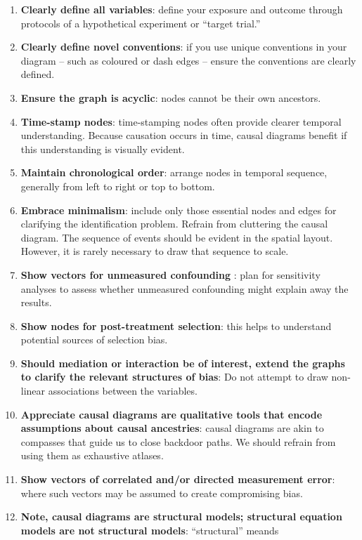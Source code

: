 \documentclass[
  singlecolumn]{article}
\begin{document}
\begin{enumerate}
\def\labelenumi{\arabic{enumi}.}
\item
  \textbf{Clearly define all variables}: define your exposure and
  outcome through protocols of a hypothetical experiment or ``target
  trial.''
\item
  \textbf{Clearly define novel conventions}: if you use unique
  conventions in your diagram -- such as coloured or dash edges --
  ensure the conventions are clearly defined.
\item
  \textbf{Ensure the graph is acyclic}: nodes cannot be their own
  ancestors.
\item
  \textbf{Time-stamp nodes}: time-stamping nodes often provide clearer
  temporal understanding. Because causation occurs in time, causal
  diagrams benefit if this understanding is visually evident.
\item
  \textbf{Maintain chronological order}: arrange nodes in temporal
  sequence, generally from left to right or top to bottom.
\item
  \textbf{Embrace minimalism}: include only those essential nodes and
  edges for clarifying the identification problem. Refrain from
  cluttering the causal diagram. The sequence of events should be
  evident in the spatial layout. However, it is rarely necessary to draw
  that sequence to scale.
\item
  \textbf{Show vectors for unmeasured confounding} : plan for
  sensitivity analyses to assess whether unmeasured confounding might
  explain away the results.
\item
  \textbf{Show nodes for post-treatment selection}: this helps to
  understand potential sources of selection bias.
\item
  \textbf{Should mediation or interaction be of interest, extend the
  graphs to clarify the relevant structures of bias}: Do not attempt to
  draw non-linear associations between the variables.
\item
  \textbf{Appreciate causal diagrams are qualitative tools that encode
  assumptions about causal ancestries}: causal diagrams are akin to
  compasses that guide us to close backdoor paths. We should refrain
  from using them as exhaustive atlases.
\item
  \textbf{Show vectors of correlated and/or directed measurement error}:
  where such vectors may be assumed to create compromising bias.
\item
  \textbf{Note, causal diagrams are structural models; structural
  equation models are not structural models}: ``structural'' meands

\end{enumerate}
\end{document}

